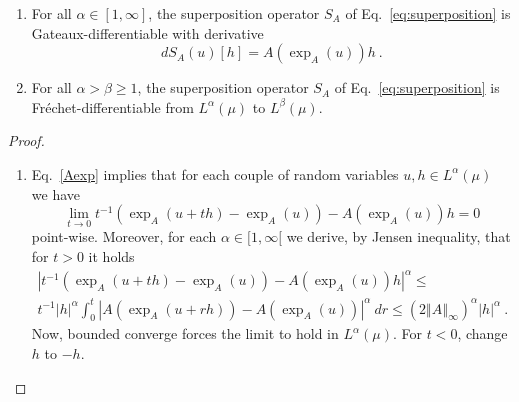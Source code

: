 \documentclass[graybox]{svmult}
\begin{document}
\begin{proposition}
\label{prop:BBA}
\begin{enumerate}
\item For all $\alpha \in [1,\infty]$, the superposition operator $S_A$ of
Eq.~\eqref{eq:superposition} is Gateaux-differentiable with derivative 
\begin{equation}  \label{eq:derivative-of-exp}
d S_A(u)[h] = A(\exp_A(u))h \ .
\end{equation}
\item \label{item:BBA2} For all $\alpha > \beta \ge 1$, the superposition operator $S_A$ of
Eq.~\eqref{eq:superposition} is Fr\'echet-differentiable from $L^{\alpha}(\mu)$
to $L^{\beta}(\mu)$.
\end{enumerate}
\end{proposition}
%
\begin{proof}
\begin{enumerate}
\item Eq.~\eqref{Aexp} implies that for each couple of random variables 
$u,h\in L^{\alpha }(\mu )$ we have 
\begin{equation*}  
\lim_{t\rightarrow 0}t^{-1}\left( \exp _{A}(u+th)-\exp _{A}(u)\right)
-A(\exp _{A}(u))h=0
\end{equation*}
point-wise. Moreover, for each $\alpha \in \lbrack 1,\infty \lbrack $ we
derive, by Jensen inequality, that for $t > 0$ it holds 
\begin{multline*}
\left\vert t^{-1}\left( \exp _{A}(u+th)-\exp _{A}(u)\right) -A(\exp
_{A}(u))h\right\vert ^{\alpha }\leq \\
t^{-1}\left\vert h\right\vert ^{\alpha }\int_{0}^{t}\left\vert A(\exp
_{A}(u+rh))-A(\exp _{A}(u))\right\vert ^{\alpha }\ dr \leq \left( 2\left\Vert
A\right\Vert _{\infty }\right) ^{\alpha }\left\vert h\right\vert ^{\alpha }\
.
\end{multline*}
Now, bounded converge forces the limit to hold in $L^{\alpha }(\mu )$. For $t < 0$, change $h$ to $-h$.


\end{enumerate}
\end{proof}
\end{document}
